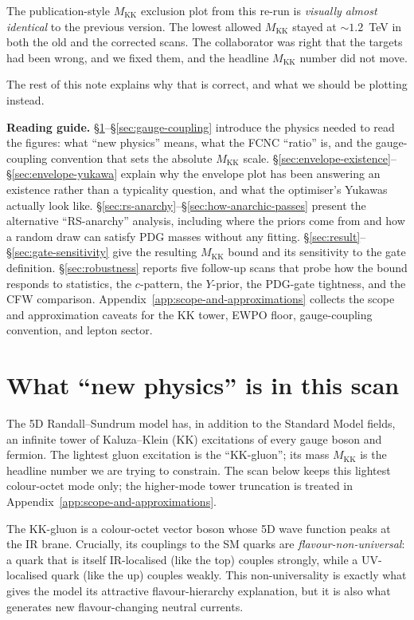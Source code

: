 \documentclass[11pt]{article}
\newcommand{\Mkk}{M_{\mathrm{KK}}}
\begin{document}
\noindent The publication-style $\Mkk$ exclusion plot from this re-run is
\emph{visually almost identical} to the previous version. The lowest allowed
$\Mkk$ stayed at $\sim 1.2$~TeV in both the old and the corrected scans.
The collaborator was right that the targets had been wrong, and we fixed
them, and the headline $\Mkk$ number did not move.

The rest of this note explains why that is correct, and what we should be
plotting instead.

\medskip
\noindent\textbf{Reading guide.}
\S\ref{sec:np}--\S\ref{sec:gauge-coupling} introduce the physics needed to
read the figures: what ``new physics'' means, what the FCNC ``ratio'' is,
and the gauge-coupling convention that sets the absolute $\Mkk$ scale.
\S\ref{sec:envelope-existence}--\S\ref{sec:envelope-yukawa} explain why
the envelope plot has been answering an existence rather than a typicality
question, and what the optimiser's Yukawas actually look like.
\S\ref{sec:rs-anarchy}--\S\ref{sec:how-anarchic-passes} present the
alternative ``RS-anarchy'' analysis, including where the priors come
from and how a random draw can satisfy PDG masses without any fitting.
\S\ref{sec:result}--\S\ref{sec:gate-sensitivity} give the resulting
$\Mkk$ bound and its sensitivity to the gate definition.
\S\ref{sec:robustness} reports five follow-up scans that probe how the
bound responds to statistics, the $c$-pattern, the $Y$-prior, the
PDG-gate tightness, and the CFW comparison.  Appendix~\ref{app:scope-and-approximations}
collects the scope and approximation caveats for the KK tower, EWPO floor,
gauge-coupling convention, and lepton sector.

\section{What ``new physics'' is in this scan}
\label{sec:np}

The 5D Randall--Sundrum model has, in addition to the Standard Model fields,
an infinite tower of Kaluza--Klein (KK) excitations of every gauge boson and
fermion. The lightest gluon excitation is the ``KK-gluon''; its mass
$\Mkk$ is the headline number we are trying to constrain. The scan below
keeps this lightest colour-octet mode only; the higher-mode tower
truncation is treated in Appendix~\ref{app:scope-and-approximations}.

The KK-gluon is a colour-octet vector boson whose 5D wave function peaks
at the IR brane. Crucially, its couplings to the SM quarks are
\emph{flavour-non-universal}: a quark that is itself IR-localised (like the
top) couples strongly, while a UV-localised quark (like the up) couples
weakly. This non-universality is exactly what gives the model its
attractive flavour-hierarchy explanation, but it is also what generates new
flavour-changing neutral currents.
\end{document}
